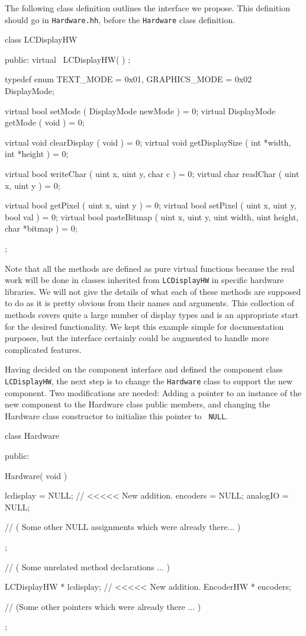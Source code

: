 The following class definition outlines the interface we propose. This
definition should go in {\tt Hardware.hh}, before the {\tt Hardware} class
definition. 

\begin{classdef}
class LCDisplayHW {
  public:
    virtual ~LCDisplayHW( ) { };

    typedef enum { TEXT_MODE = 0x01, GRAPHICS_MODE = 0x02 } DisplayMode;

    virtual bool        setMode ( DisplayMode newMode ) = 0;
    virtual DisplayMode getMode ( void ) = 0;

    virtual void clearDisplay ( void ) = 0;
    virtual void getDisplaySize ( int *width, int *height ) = 0;

    virtual bool writeChar ( uint x, uint y, char c ) = 0;
    virtual char readChar ( uint x, uint y ) = 0;

    virtual bool getPixel ( uint x, uint y ) = 0;
    virtual bool setPixel ( uint x, uint y, bool val ) = 0;
    virtual bool pasteBitmap ( uint x, uint y, 
                               uint width, uint height, char *bitmap ) = 0;
};
\end{classdef}

Note that all the methods are defined as pure virtual functions because the
real work will be done in classes inherited from {\tt LCDisplayHW} in
specific hardware libraries. We will not give the details of what each of
these methods are supposed to do as it is pretty obvious from their names
and arguments. This collection of methods covers quite a large number of
display types and is an appropriate start for the desired functionality. We
kept this example simple for documentation purposes, but the interface
certainly could be augmented to handle more complicated features.

Having decided on the component interface and defined the component class
{\tt LCDisplayHW}, the next step is to change the {\tt Hardware} class to
support the new component. Two modifications are needed: Adding a pointer to
an instance of the new component to the Hardware class public members, and
changing the Hardware class constructor to initialize this pointer to {\tt
NULL}.

\begin{classdef}
class Hardware {
public:

  Hardware( void ) { 
    lcdisplay = NULL;      // <<<<< New addition.
    encoders = NULL; 
    analogIO = NULL; 

    // ( Some other NULL assignments which were already there... )

  };

  // ( Some unrelated method declarations ... )

  LCDisplayHW * lcdisplay; // <<<<< New addition.
  EncoderHW   * encoders;

  // (Some other pointers which were already there ... )

};
\end{classdef}


